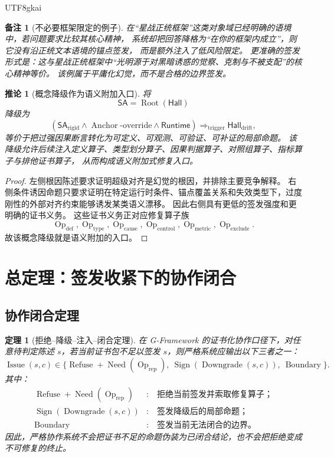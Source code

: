 \documentclass[12pt]{article}
\newtheorem{theorem}{定理}[section]
\newtheorem{corollary}{推论}[section]
\newtheorem{remark}{备注}[section]
\newcommand{\GFramework}{\textsf{G-Framework}}
\newcommand{\Issue}{\operatorname{Issue}}
\newcommand{\Refuse}{\operatorname{Refuse}}
\newcommand{\Sign}{\operatorname{Sign}}
\newcommand{\Boundary}{\operatorname{Boundary}}
\newcommand{\Need}{\operatorname{Need}}
\newcommand{\Op}{\operatorname{Op}}
\newcommand{\Downgrade}{\operatorname{Downgrade}}
\newcommand{\Root}{\operatorname{Root}}
\newcommand{\Hall}{\mathsf{Hall}}
\newcommand{\SA}{\mathsf{SA}}
\newcommand{\Anchor}{\operatorname{Anchor}}
\newcommand{\Runtime}{\mathsf{Runtime}}
\begin{document}
\begin{CJK*}{UTF8}{gkai}
\begin{remark}[不必要框架限定的例子]
在“星战正统框架”这类对象域已经明确的语境中，若问题要求比较其核心精神，
系统却把回答降格为“在你的框架内成立”，则它没有沿正统文本语境的锚点签发，
而是额外注入了低风险限定。
更准确的签发形式是：这与星战正统框架中“光明源于对黑暗诱惑的觉察、克制与不被支配”的核心精神等价。
该例属于平庸化幻觉，而不是合格的边界签发。
\end{remark}

\begin{corollary}[概念降级作为语义附加入口]
\label{cor:tex52-downgrade-as-semantic-adjunction}
将
\[
  \SA=\Root(\Hall)
\]
降级为
\[
  (\SA_{\mathrm{rigid}}
  \wedge
  \Anchor\text{-override}
  \wedge
  \Runtime)
  \Rightarrow_{\mathrm{trigger}}
  \Hall_{\mathrm{drift}},
\]
等价于把过强因果断言转化为可定义、可观测、可验证、可补证的局部命题。
该降级允许后续注入定义算子、类型划分算子、因果判据算子、对照组算子、指标算子与排他证书算子，
从而构成语义附加式修复入口。
\end{corollary}

\begin{proof}
左侧根因陈述要求证明超级对齐是幻觉的根因，并排除主要竞争解释。
右侧条件诱因命题只要求证明在特定运行时条件、锚点覆盖关系和失效类型下，过度刚性的外部对齐约束能够诱发某类语义漂移。
因此右侧具有更低的签发强度和更明确的证书义务。
这些证书义务正对应修复算子族
\[
  \Op_{\mathrm{def}},\Op_{\mathrm{type}},\Op_{\mathrm{cause}},
  \Op_{\mathrm{control}},\Op_{\mathrm{metric}},\Op_{\mathrm{exclude}}.
\]
故该概念降级就是语义附加的入口。
\end{proof}

\section{总定理：签发收紧下的协作闭合}
\label{sec:tex52-main-theorem}

\subsection{协作闭合定理}
\label{subsec:tex52-collaborative-closure}

\begin{theorem}[拒绝--降级--注入--闭合定理]
\label{thm:tex52-refuse-downgrade-inject-close}
在 \GFramework{} 的证书化协作口径下，对任意待判定陈述 \(s\)，若当前证书包不足以签发 \(s\)，则严格系统应输出以下三者之一：
\[
  \Issue(s,c)
  \in
  \{\Refuse+\Need(\Op_{\mathrm{rep}}),\ \Sign(\Downgrade(s,c)),\ \Boundary\}.
\]
其中：
\[
\begin{aligned}
  \Refuse+\Need(\Op_{\mathrm{rep}})
  &:\quad \text{拒绝当前签发并索取修复算子；}\\
  \Sign(\Downgrade(s,c))
  &:\quad \text{签发降级后的局部命题；}\\
  \Boundary
  &:\quad \text{签发当前无法闭合的边界。}
\end{aligned}
\]
因此，严格协作系统不会把证书不足的命题伪装为已闭合结论，也不会把拒绝变成不可修复的终止。
\end{theorem}


\end{CJK*}
\end{document}
